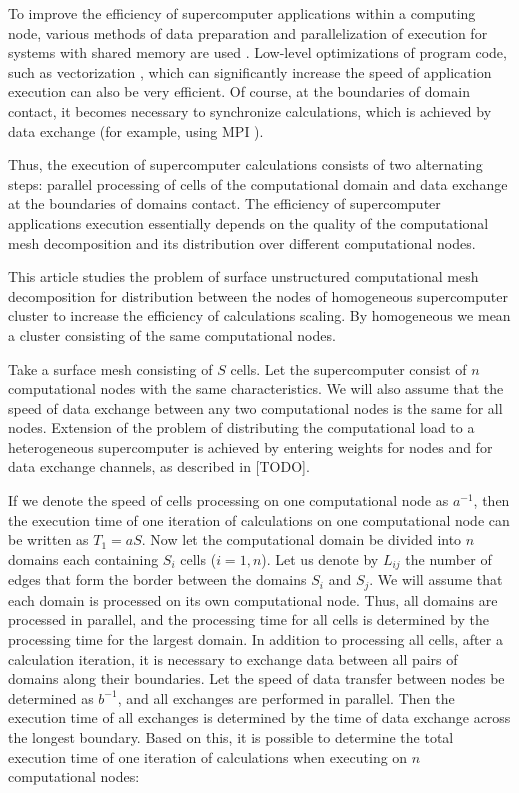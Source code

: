 \documentclass[
11pt,%
tightenlines,%
twoside,%
onecolumn,%
nofloats,%
nobibnotes,%
nofootinbib,%
superscriptaddress,%
noshowpacs,%
centertags]%
{revtex4}
\begin{document}
To improve the efficiency of supercomputer applications within a computing node, various methods of data preparation and parallelization of execution for systems with shared memory are used \cite{Dorris_OpenMP}.
Low-level optimizations of program code, such as vectorization \cite{Shabanov_Vec}, which can significantly increase the speed of application execution can also be very efficient.
Of course, at the boundaries of domain contact, it becomes necessary to synchronize calculations, which is achieved by data exchange (for example, using MPI \cite{Kalantzis_MPI}).

Thus, the execution of supercomputer calculations consists of two alternating steps: parallel processing of cells of the computational domain and data exchange at the boundaries of domains contact.
The efficiency of supercomputer applications execution essentially depends on the quality of the computational mesh decomposition and its distribution over different computational nodes.

This article studies the problem of surface unstructured computational mesh decomposition for distribution between the nodes of homogeneous supercomputer cluster to increase the efficiency of calculations scaling.
By homogeneous we mean a cluster consisting of the same computational nodes.

Take a surface mesh consisting of $ S $ cells.
Let the supercomputer consist of $ n $ computational nodes with the same characteristics.
We will also assume that the speed of data exchange between any two computational nodes is the same for all nodes.
Extension of the problem of distributing the computational load to a heterogeneous supercomputer is achieved by entering weights for nodes and for data exchange channels, as described in [TODO].

If we denote the speed of cells processing on one computational node as $ a^{-1} $, then the execution time of one iteration of calculations on one computational node can be written as $ T_1 = aS $.
Now let the computational domain be divided into $ n $ domains each containing $ S_i $ cells ($ i = 1, n $).
Let us denote by $ L_{ij} $ the number of edges that form the border between the domains $ S_i $ and $ S_j $.
We will assume that each domain is processed on its own computational node.
Thus, all domains are processed in parallel, and the processing time for all cells is determined by the processing time for the largest domain.
In addition to processing all cells, after a calculation iteration, it is necessary to exchange data between all pairs of domains along their boundaries.
Let the speed of data transfer between nodes be determined as $ b^{-1} $, and all exchanges are performed in parallel.
Then the execution time of all exchanges is determined by the time of data exchange across the longest boundary.
Based on this, it is possible to determine the total execution time of one iteration of calculations when executing on $ n $ computational nodes:
\end{document}
